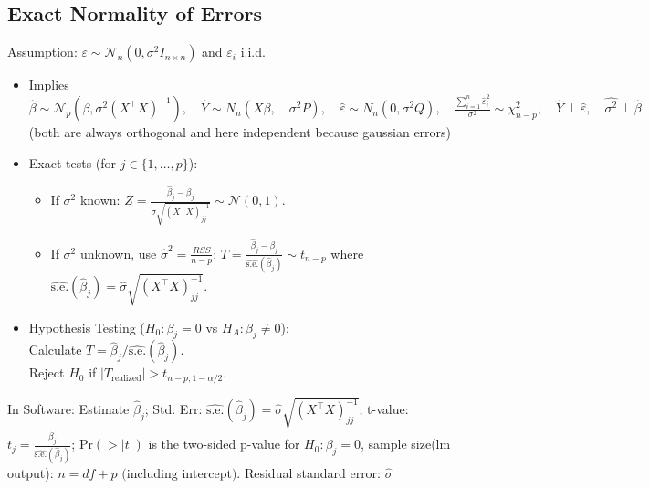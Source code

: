 \subsection*{Exact Normality of Errors}
Assumption: $\varepsilon \sim \mathcal{N}_n(0, \sigma^2 I_{n \times n})$ and $\varepsilon_i$ i.i.d.
\begin{itemize}
    \item Implies $\hat{\beta} \sim \mathcal{N}_p(\beta, \sigma^2(X^\top X)^{-1}), \quad \hat{Y} \sim N_n(X\beta, \quad \sigma^2 P), \quad \hat{\varepsilon} \sim N_n(0, \sigma^2 Q), \quad \frac{\sum_{i=1}^n \hat{\varepsilon}_i^2}{\sigma^2} \sim \chi^2_{n-p} , \quad \hat{Y} \perp \hat{\varepsilon}, \quad \widehat{\sigma^2} \perp \widehat{\beta}$ (both are always orthogonal and here independent because gaussian errors)
    \item Exact tests (for $j \in \{1,\dots,p\}$):
    \begin{itemize}
        \item If $\sigma^2$ known: $Z = \frac{\hat{\beta}_j - \beta_j}{\sigma \sqrt{(X^\top X)^{-1}_{jj}}} \sim \mathcal{N}(0,1)$.
        \item If $\sigma^2$ unknown, use $\hat{\sigma}^2 = \frac{RSS}{n-p}$:
        $T = \frac{\hat{\beta}_j - \beta_j}{\widehat{\text{s.e.}}(\hat{\beta}_j)} \sim t_{n-p}$
        where $\widehat{\text{s.e.}}(\hat{\beta}_j) = \hat{\sigma} \sqrt{(X^\top X)^{-1}_{jj}}$.
    \end{itemize}
    \item Hypothesis Testing ($H_0: \beta_j = 0$ vs $H_A: \beta_j \neq 0$):
    \\ Calculate $T = \hat{\beta}_j / \widehat{\text{s.e.}}(\hat{\beta}_j)$.
    \\ Reject $H_0$ if $|T_{\text{realized}}| > t_{n-p, 1-\alpha/2}$.
\end{itemize}


In Software: Estimate $\hat{\beta}_j$; Std. Err: $\widehat{\text{s.e.}}(\hat{\beta}_j) = \hat{\sigma} \sqrt{(X^\top X)^{-1}_{jj}}$; t-value: $t_j = \frac{\hat{\beta}_j}{\widehat{\text{s.e.}}(\hat{\beta}_j)}$; $\text{Pr}(>|t|)$ is the two-sided p-value for $H_0: \beta_j = 0$, sample size(lm output): $n= df +p \text{ (including intercept)}$. Residual standard error: $\hat{\sigma}$


